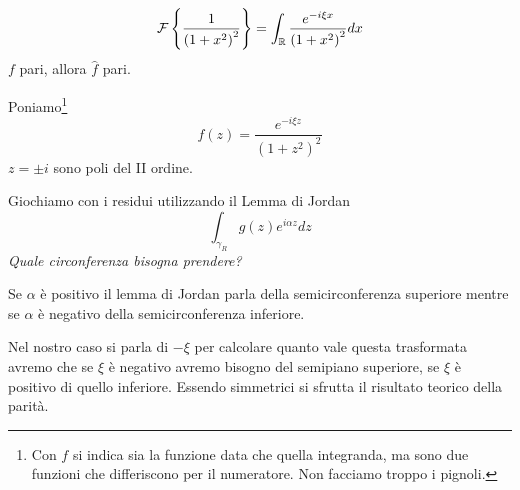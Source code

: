 \begin{equation*}
\mathcal{F} \left\{\frac{1}{\left(1 + x^{2}\right)^{2}}\right\} = \int_{\mathbb{R}}\frac{e^{- i\xi x}}{\left(1 + x^{2}\right)^{2}} dx
\end{equation*}
$f$ pari, allora $\hat{f}$ pari.

Poniamo\footnote{Con $f$ si indica sia la funzione data che quella integranda, ma sono due funzioni che differiscono per il numeratore. Non facciamo troppo i pignoli.}
\begin{equation*}
f(z) = \frac{e^{- i\xi z}}{\left(1 + z^{2}\right)^{2}}
\end{equation*}
$z = \pm i$ sono poli del II ordine.

Giochiamo con i residui utilizzando il Lemma di Jordan
\begin{equation*}
\int_{\gamma_{R}} g(z) e^{i\alpha z} dz
\end{equation*}
\textit{Quale circonferenza bisogna prendere?}

Se $\alpha $ è positivo il lemma di Jordan parla della semicirconferenza superiore mentre se $\alpha $ è negativo della semicirconferenza inferiore.

Nel nostro caso si parla di $ - \xi $ per calcolare quanto vale questa trasformata avremo che se $\xi $ è negativo avremo bisogno del semipiano superiore, se $\xi $ è positivo di quello inferiore. Essendo simmetrici si sfrutta il risultato teorico della parità.


